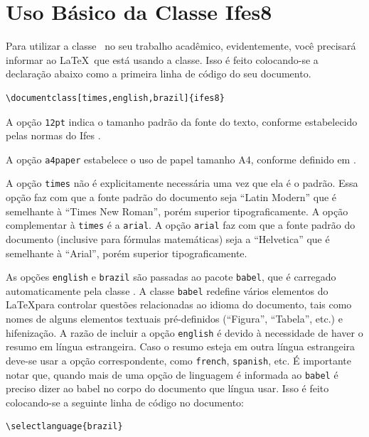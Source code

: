 \documentclass[times,english,brazilian,oneside,section=TITLE]{ifes8}
\begin{document}
\section{Uso Básico da Classe Ifes8}
\label{sec:uso-basico}

Para utilizar a classe \ifestex\ no seu trabalho acadêmico,
evidentemente, você precisará informar ao \LaTeX\ que está usando a
classe. Isso é feito colocando-se a declaração abaixo como a primeira
linha de código do seu documento.\vspace{\baselineskip}

\begin{lstlisting}[language={[LaTeX]TeX}]
  \documentclass[times,english,brazil]{ifes8}  
\end{lstlisting}

A opção \texttt{12pt} indica o tamanho padrão da fonte do texto,
conforme estabelecido pelas normas do Ifes \cite[pp.~20]{Ifes2024}.

A opção \texttt{a4paper} estabelece o uso de papel tamanho A4,
conforme definido em \cite[pp.~19]{Ifes2024}.

A opção \texttt{times} não é explicitamente necessária uma vez que ela
é o padrão. Essa opção faz com que a fonte padrão do documento seja
“Latin Modern” que é semelhante à “Times New Roman”, porém superior
tipograficamente. A opção complementar à \texttt{times} é a
\texttt{arial}. A opção \texttt{arial} faz com que a fonte padrão do
documento (inclusive para fórmulas matemáticas) seja a “Helvetica” que
é semelhante à “Arial”, porém superior tipograficamente.

As opções \texttt{english} e \texttt{brazil} são passadas ao pacote
\texttt{babel}, que é carregado automaticamente pela classe \abnTeX.
A classe \texttt{babel} redefine vários elementos do \LaTeX para
controlar questões relacionadas ao idioma do documento, tais como
nomes de alguns elementos textuais pré-definidos (``Figura'',
``Tabela'', etc.) e hifenização. A razão de incluir a opção
\texttt{english} é devido à necessidade de haver o resumo em língua
estrangeira. Caso o resumo esteja em outra língua estrangeira deve-se
usar a opção correspondente, como \texttt{french}, \texttt{spanish},
etc. É importante notar que, quando mais de uma opção de linguagem é
informada ao \texttt{babel} é preciso dizer ao babel no corpo do
documento que língua usar. Isso é feito colocando-se a seguinte linha
de código no documento:\vspace{\baselineskip}

\begin{lstlisting}[language={[LaTeX]TeX}]
  \selectlanguage{brazil}  
\end{lstlisting}
\end{document}
